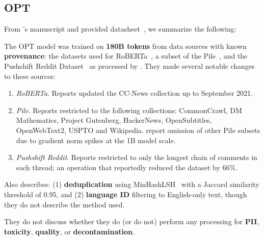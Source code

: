 \subsection{OPT~\citep{zhang-2022-language}}\label{appendix:llm:opt} 

From \citet{zhang-2022-language}'s manuscript and provided datasheet~\citep{gebru2021datasheets}, we summarize the following:

The OPT model was trained on \textbf{180B tokens} from data sources with known \textbf{provenance}: the datasets used for RoBERTa~\citep{Liu2019RoBERTaAR}, a subset of the Pile~\citep{Gao2020ThePA}, and the Pushshift Reddit Dataset~\citep{pushshift} as processed by \citep{roller-etal-2021-recipes}. They made several notable changes to these sources:

\begin{enumerate}
    \item \emph{RoBERTa}.  Reports updated the CC-News collection up to September 2021.
    \item \emph{Pile}. Reports restricted to the following collections: CommonCrawl, DM Mathematics, Project Gutenberg, HackerNews, OpenSubtitles, OpenWebText2, USPTO and Wikipedia. \citep{zhang-2022-language} report omission of other Pile subsets due to gradient norm spikes at the 1B model scale.
    \item \emph{Pushshift Reddit}. 
    Reports restricted to only the longest chain of comments in each thread; an operation that reportedly reduced the dataset by 66\%.
\end{enumerate}


Also describes: (1) \textbf{deduplication} using MinHashLSH~\citep{rajaraman-ullman-minhash-lsh} with a Jaccard similarity threshold of 0.95, and (2) \textbf{language ID} filtering to English-only text, though they do not describe the method used. 

They do not discuss whether they do (or do not) perform any processing for \textbf{PII}, \textbf{toxicity}, \textbf{quality}, or \textbf{decontamination}. 














